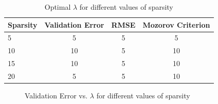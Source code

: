 \documentclass[a4paper,12pt]{article}
\begin{document}
\begin{table}[H]
\centering
\begin{tabular}{|l|ccc|}
\hline
Sparsity & Validation Error & RMSE & Mozorov Criterion \\ \hline
5 & 5 & 5 & 5 \\ 
10 & 10 & 5 & 10 \\ 
15 & 10 & 5 & 10 \\ 
20 & 5 & 5 & 10 \\
\hline
\end{tabular}
\caption{Optimal $\lambda$ for different values of sparsity}
\end{table}

\begin{figure}[htbp]
  \centering
  \caption{Validation Error vs. $\lambda$ for different values of sparsity}
  \label{fig:validationError}
\end{figure}
\end{document}
